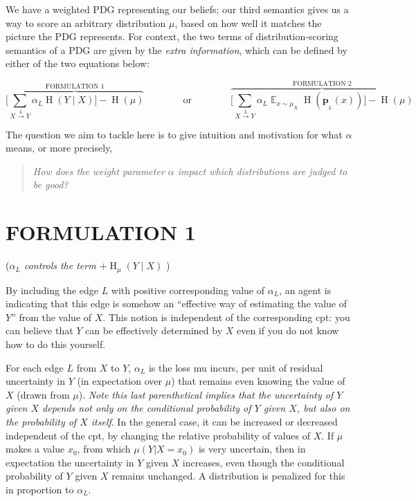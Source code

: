 \documentclass{article}
\renewcommand{\H}{\mathop{\mathrm H}}
\newcommand{\E}{\mathop{\mathbb E}}
\newcommand{\bp}[1][L]{\mathbf{p}_{\!_#1\!}}
\begin{document}
We have a weighted PDG representing our beliefs; 
our third semantics gives us a way to score an arbitrary distribution $\mu$,
based on how well it matches the picture the PDG represents.  For context, the two terms of distribution-scoring semantics of a PDG are given by the \emph{extra information}, which can be defined by either of the two equations below:

\[ 	
	 \overbrace{\Bigg[\sum_{ X \xrightarrow{\!\!L} Y  } \alpha_L \H(Y \mid X) \Bigg] - \H(\mu) }^{\text{FORMULATION 1}}
		\qquad\qquad \text{or} \qquad\qquad
		\overbrace{\Bigg[\sum_{ X \xrightarrow{\!\!L} Y  } 
		\alpha_L \E_{x \sim \mu_X}  \H (\bp (x)) \Bigg] - \H(\mu)}^{\text{FORMULATION 2}}
\] 

The question we aim to tackle here is to give intuition and motivation for what $\alpha$ means, or more precisely, 

\begin{quote}\it
How does the weight parameter $\alpha$ impact which distributions are judged to be good?
\end{quote}

\section*{FORMULATION 1}
\vspace{-1em}
\hspace{1in}(\textit{$\alpha_L$ controls the term $+\H_\mu(Y \mid X)$} )
\vspace{1em}

By including the edge $L$ with positive corresponding value of $\alpha_L$, 
an agent is indicating that this edge is somehow an ``effective way of estimating the value of $Y$'' from the value of $X$. This notion is independent of the corresponding cpt: you can believe that $Y$ can be effectively determined by $X$ even if you do not know how to do this yourself.

For each edge $L$ from $X$ to $Y$, $\alpha_L$ is the loss mu incurs, per unit of residual uncertainty in $Y$ (in expectation over $\mu$) that remains even knowing the value of $X$ (drawn from $\mu$). \textit{Note this last parenthetical implies that the uncertainty of $Y$ given $X$ depends not only on the conditional probability of $Y$ given $X$, but also on the probability of $X$ itself}. In the general case, it can be increased or decreased independent of the cpt, by changing the relative probability of values of $X$. If $\mu$ makes a value $x_0$, from which $\mu(Y | X = x_0)$ is very uncertain, then in expectation the uncertainty in $Y$ given $X$ increases, even though the conditional probability of $Y$ given $X$ remains unchanged. A distribution is penalized for this in proportion to $\alpha_L$. 
\end{document}

